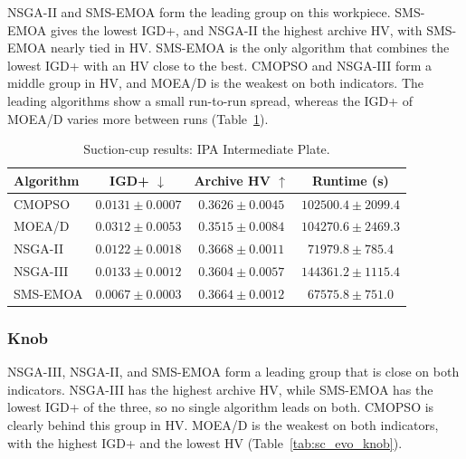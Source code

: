 NSGA-II and SMS-EMOA form the leading group on this workpiece. SMS-EMOA gives the lowest
IGD+, and NSGA-II the highest archive HV, with SMS-EMOA nearly tied in HV. SMS-EMOA is the
only algorithm that combines the lowest IGD+ with an HV close to the best. CMOPSO and
NSGA-III form a middle group in HV, and MOEA/D is the weakest on both indicators. The
leading algorithms show a small run-to-run spread, whereas the IGD+ of MOEA/D varies more
between runs (Table~\ref{tab:sc_evo_intermediate_plate}).

\begin{table}[htbp]
    \centering
    \caption{Suction-cup results: IPA Intermediate Plate.}
    \label{tab:sc_evo_intermediate_plate}
    \begin{tabular}{@{}lccc@{}}
        \toprule
        \textbf{Algorithm} & \textbf{IGD+} $\downarrow$ & \textbf{Archive HV} $\uparrow$ & \textbf{Runtime (s)} \\
        \midrule
        CMOPSO   & $0.0131 \pm 0.0007$ & $0.3626 \pm 0.0045$ & $102500.4 \pm 2099.4$ \\
        MOEA/D   & $0.0312 \pm 0.0053$ & $0.3515 \pm 0.0084$ & $104270.6 \pm 2469.3$ \\
        NSGA-II  & $0.0122 \pm 0.0018$ & {\boldmath$0.3668 \pm 0.0011$} & $71979.8 \pm 785.4$ \\
        NSGA-III & $0.0133 \pm 0.0012$ & $0.3604 \pm 0.0057$ & $144361.2 \pm 1115.4$ \\
        SMS-EMOA & {\boldmath$0.0067 \pm 0.0003$} & $0.3664 \pm 0.0012$ & $67575.8 \pm 751.0$ \\
        \bottomrule
    \end{tabular}
\end{table}

\subsubsection{Knob}
\label{subsubsec:results_sc_knob}

NSGA-III, NSGA-II, and SMS-EMOA form a leading group that is close on both indicators.
NSGA-III has the highest archive HV, while SMS-EMOA has the lowest IGD+ of the three, so no
single algorithm leads on both. CMOPSO is clearly behind this group in HV. MOEA/D is the
weakest on both indicators, with the highest IGD+ and the lowest HV
(Table~\ref{tab:sc_evo_knob}).

